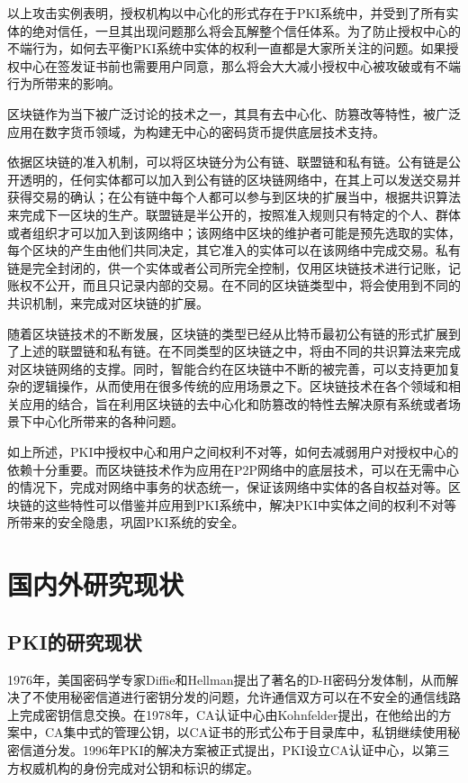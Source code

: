 以上攻击实例表明，授权机构以中心化的形式存在于PKI系统中，并受到了所有实体的绝对信任，一旦其出现问题那么将会瓦解整个信任体系。为了防止授权中心的不端行为，如何去平衡PKI系统中实体的权利一直都是大家所关注的问题。如果授权中心在签发证书前也需要用户同意，那么将会大大减小授权中心被攻破或有不端行为所带来的影响。

区块链作为当下被广泛讨论的技术之一，其具有去中心化、防篡改等特性，被广泛应用在数字货币领域，为构建无中心的密码货币提供底层技术支持。

依据区块链的准入机制，可以将区块链分为公有链、联盟链和私有链。公有链是公开透明的，任何实体都可以加入到公有链的区块链网络中，在其上可以发送交易并获得交易的确认；在公有链中每个人都可以参与到区块的扩展当中，根据共识算法来完成下一区块的生产。联盟链是半公开的，按照准入规则只有特定的个人、群体或者组织才可以加入到该网络中；该网络中区块的维护者可能是预先选取的实体，每个区块的产生由他们共同决定，其它准入的实体可以在该网络中完成交易。私有链是完全封闭的，供一个实体或者公司所完全控制，仅用区块链技术进行记账，记账权不公开，而且只记录内部的交易。在不同的区块链类型中，将会使用到不同的共识机制，来完成对区块链的扩展。


随着区块链技术的不断发展，区块链的类型已经从比特币最初公有链的形式扩展到了上述的联盟链和私有链。在不同类型的区块链之中，将由不同的共识算法来完成对区块链网络的支撑。同时，智能合约在区块链中不断的被完善，可以支持更加复杂的逻辑操作，从而使用在很多传统的应用场景之下。区块链技术在各个领域和相关应用的结合，旨在利用区块链的去中心化和防篡改的特性去解决原有系统或者场景下中心化所带来的各种问题。


如上所述，PKI中授权中心和用户之间权利不对等，如何去减弱用户对授权中心的依赖十分重要。而区块链技术作为应用在P2P网络中的底层技术，可以在无需中心的情况下，完成对网络中事务的状态统一，保证该网络中实体的各自权益对等。区块链的这些特性可以借鉴并应用到PKI系统中，解决PKI中实体之间的权利不对等所带来的安全隐患，巩固PKI系统的安全。


\section{国内外研究现状}

\subsection{PKI的研究现状}

1976年，美国密码学专家Diffie和Hellman提出了著名的D-H密码分发体制，从而解决了不使用秘密信道进行密钥分发的问题，允许通信双方可以在不安全的通信线路上完成密钥信息交换。在1978年，CA认证中心由Kohnfelder提出，在他给出的方案中，CA集中式的管理公钥，以CA证书的形式公布于目录库中，私钥继续使用秘密信道分发。1996年PKI的解决方案被正式提出，PKI设立CA认证中心，以第三方权威机构的身份完成对公钥和标识的绑定。

